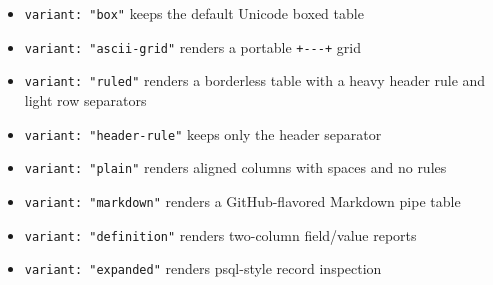 \begin{itemize}
\tightlist
\item
  \texttt{v\allowbreak{}a\allowbreak{}r\allowbreak{}i\allowbreak{}a\allowbreak{}n\allowbreak{}t\allowbreak{}:\allowbreak{} \allowbreak{}"\allowbreak{}b\allowbreak{}o\allowbreak{}x\allowbreak{}"} keeps the default Unicode boxed table
\item
  \texttt{v\allowbreak{}a\allowbreak{}r\allowbreak{}i\allowbreak{}a\allowbreak{}n\allowbreak{}t\allowbreak{}:\allowbreak{} \allowbreak{}"\allowbreak{}a\allowbreak{}s\allowbreak{}c\allowbreak{}i\allowbreak{}i\allowbreak{}-\allowbreak{}g\allowbreak{}r\allowbreak{}i\allowbreak{}d\allowbreak{}"} renders a portable \texttt{+\allowbreak{}-\allowbreak{}-\allowbreak{}-\allowbreak{}+} grid
\item
  \texttt{v\allowbreak{}a\allowbreak{}r\allowbreak{}i\allowbreak{}a\allowbreak{}n\allowbreak{}t\allowbreak{}:\allowbreak{} \allowbreak{}"\allowbreak{}r\allowbreak{}u\allowbreak{}l\allowbreak{}e\allowbreak{}d\allowbreak{}"} renders a borderless table with a heavy header rule and light row separators
\item
  \texttt{v\allowbreak{}a\allowbreak{}r\allowbreak{}i\allowbreak{}a\allowbreak{}n\allowbreak{}t\allowbreak{}:\allowbreak{} \allowbreak{}"\allowbreak{}h\allowbreak{}e\allowbreak{}a\allowbreak{}d\allowbreak{}e\allowbreak{}r\allowbreak{}-\allowbreak{}r\allowbreak{}u\allowbreak{}l\allowbreak{}e\allowbreak{}"} keeps only the header separator
\item
  \texttt{v\allowbreak{}a\allowbreak{}r\allowbreak{}i\allowbreak{}a\allowbreak{}n\allowbreak{}t\allowbreak{}:\allowbreak{} \allowbreak{}"\allowbreak{}p\allowbreak{}l\allowbreak{}a\allowbreak{}i\allowbreak{}n\allowbreak{}"} renders aligned columns with spaces and no rules
\item
  \texttt{v\allowbreak{}a\allowbreak{}r\allowbreak{}i\allowbreak{}a\allowbreak{}n\allowbreak{}t\allowbreak{}:\allowbreak{} \allowbreak{}"\allowbreak{}m\allowbreak{}a\allowbreak{}r\allowbreak{}k\allowbreak{}d\allowbreak{}o\allowbreak{}w\allowbreak{}n\allowbreak{}"} renders a GitHub-flavored Markdown pipe table
\item
  \texttt{v\allowbreak{}a\allowbreak{}r\allowbreak{}i\allowbreak{}a\allowbreak{}n\allowbreak{}t\allowbreak{}:\allowbreak{} \allowbreak{}"\allowbreak{}d\allowbreak{}e\allowbreak{}f\allowbreak{}i\allowbreak{}n\allowbreak{}i\allowbreak{}t\allowbreak{}i\allowbreak{}o\allowbreak{}n\allowbreak{}"} renders two-column field/value reports
\item
  \texttt{v\allowbreak{}a\allowbreak{}r\allowbreak{}i\allowbreak{}a\allowbreak{}n\allowbreak{}t\allowbreak{}:\allowbreak{} \allowbreak{}"\allowbreak{}e\allowbreak{}x\allowbreak{}p\allowbreak{}a\allowbreak{}n\allowbreak{}d\allowbreak{}e\allowbreak{}d\allowbreak{}"} renders psql-style record inspection
\end{itemize}

